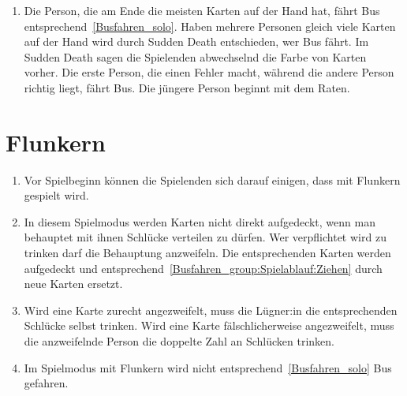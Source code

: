 \begin{enumerate}[label={(\arabic*)}]
    \item
    Die Person, die am Ende die meisten Karten auf der Hand hat, fährt Bus entsprechend~\ref{Busfahren_solo}.
    Haben mehrere Personen gleich viele Karten auf der Hand wird durch Sudden Death entschieden, wer Bus fährt.
    Im Sudden Death sagen die Spielenden abwechselnd die Farbe von Karten vorher.
    Die erste Person, die einen Fehler macht, während die andere Person richtig liegt, fährt Bus.
    Die jüngere Person beginnt mit dem Raten.
\end{enumerate}

\section{Flunkern}
\begin{enumerate}[label={(\arabic*)}]
\item
Vor Spielbeginn können die Spielenden sich darauf einigen, dass mit Flunkern gespielt wird.

\item
In diesem Spielmodus werden Karten nicht direkt aufgedeckt, wenn man behauptet mit ihnen Schlücke verteilen zu dürfen.
Wer verpflichtet wird zu trinken darf die Behauptung anzweifeln.
Die entsprechenden Karten werden aufgedeckt und entsprechend~\ref{Busfahren_group:Spielablauf:Ziehen} durch neue Karten ersetzt.

\item
Wird eine Karte zurecht angezweifelt, muss die Lügner:in die entsprechenden Schlücke selbst trinken.
Wird eine Karte fälschlicherweise angezweifelt, muss die anzweifelnde Person die doppelte Zahl an Schlücken trinken.

\item
Im Spielmodus mit Flunkern wird nicht entsprechend~\ref{Busfahren_solo} Bus gefahren.
\end{enumerate}
